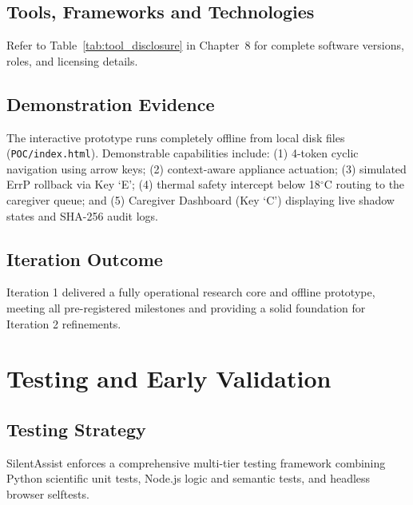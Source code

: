 \documentclass[12pt,a4paper]{report}
\begin{document}
\section{Tools, Frameworks and Technologies}
Refer to Table~\ref{tab:tool_disclosure} in Chapter~8 for complete software versions, roles, and licensing details.

\section{Demonstration Evidence}
The interactive prototype runs completely offline from local disk files (\texttt{POC/index.html}). Demonstrable capabilities include: (1) 4-token cyclic navigation using arrow keys; (2) context-aware appliance actuation; (3) simulated ErrP rollback via Key `E'; (4) thermal safety intercept below 18$^\circ$C routing to the caregiver queue; and (5) Caregiver Dashboard (Key `C') displaying live shadow states and SHA-256 audit logs.

\section{Iteration Outcome}
Iteration 1 delivered a fully operational research core and offline prototype, meeting all pre-registered milestones and providing a solid foundation for Iteration 2 refinements.

\chapter{Testing and Early Validation}

\section{Testing Strategy}
SilentAssist enforces a comprehensive multi-tier testing framework combining Python scientific unit tests, Node.js logic and semantic tests, and headless browser selftests.
\end{document}
